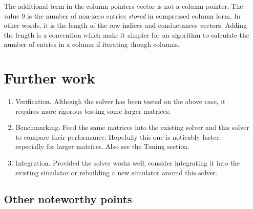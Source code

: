 \documentclass[11pt]{article}
\begin{document}
The additional term in the column pointers vector is not a column pointer. The value 9 is the number of non-zero entries \emph{stored} in compressed column form, In other words, it is the length of the row indices and conductances vectors. Adding the length is a convention which make it simpler for an algorithm to calculate the number of entries in a column if iterating though columns.

\section{Further work}

\begin{enumerate}
    \item Verification. Although the solver has been tested on the above case, it requires more rigorous testing some larger matrices.
    \item Benchmarking. Feed the same matrices into the existing solver and this solver to compare their performance. Hopefully this one is noticably faster, especially for larger matrices. Also see the Tuning section.
    \item Integration. Provided the solver works well, consider integrating it into the existing simulator or rebuilding a new simulator around this solver.
\end{enumerate}

\subsection{Other noteworthy points}
\end{document}
